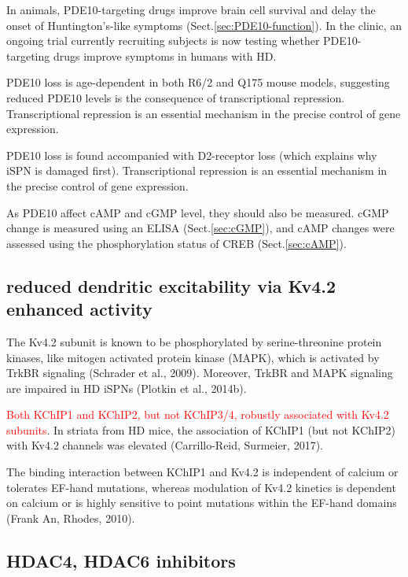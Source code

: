 In animals, PDE10-targeting drugs improve brain cell survival and delay the
onset of Huntington's-like symptoms (Sect.\ref{sec:PDE10-function}). In the
clinic, an ongoing trial currently recruiting subjects is now testing whether
PDE10-targeting drugs improve symptoms in humans with HD.

PDE10 loss is age-dependent in both R6/2 and Q175 mouse models, suggesting
reduced PDE10 levels is the consequence of transcriptional repression.
Transcriptional repression is an essential mechanism in the precise control of
gene expression.

PDE10 loss is found accompanied with D2-receptor loss (which explains why iSPN
is damaged first). Transcriptional repression is an essential mechanism in the
precise control of gene expression.

As PDE10 affect cAMP and cGMP level, they should also be measured.
cGMP change is measured using an ELISA (Sect.\ref{sec:cGMP}), and cAMP changes
were assessed using the phosphorylation status of CREB (Sect.\ref{sec:cAMP}).



\subsection{reduced dendritic excitability via Kv4.2 enhanced activity}

The Kv4.2 subunit is known to be phosphorylated by serine-threonine protein
kinases, like mitogen activated protein kinase (MAPK), which is activated by
TrkBR signaling (Schrader et al., 2009). Moreover, TrkBR and MAPK signaling are
impaired in HD iSPNs (Plotkin et al., 2014b).

\textcolor{red}{Both KChIP1 and KChIP2, but not KChIP3/4, robustly associated
with Kv4.2 subunits}. In striata from HD mice, the association of KChIP1 (but
not KChIP2) with Kv4.2 channels was elevated (Carrillo-Reid, Surmeier, 2017).

The binding interaction between KChIP1 and Kv4.2 is independent of calcium or
tolerates EF-hand mutations, whereas modulation of Kv4.2 kinetics is dependent
on calcium or is highly sensitive to point mutations within the EF-hand domains
 (Frank An, Rhodes, 2010).



\subsection{HDAC4, HDAC6 inhibitors}
\label{sec:HD-theory-HDAC-inhibitor}

